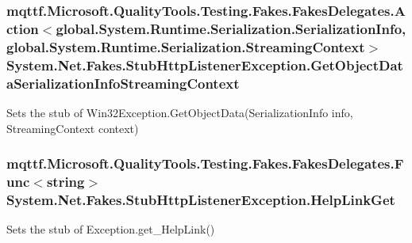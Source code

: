 \hypertarget{class_system_1_1_net_1_1_fakes_1_1_stub_http_listener_exception_aba44f8f6934146257ae4d5f9253fe294}{
\subsubsection[{Get\-Object\-Data\-Serialization\-Info\-Streaming\-Context}]{\setlength{\rightskip}{0pt plus 5cm}mqttf.\-Microsoft.\-Quality\-Tools.\-Testing.\-Fakes.\-Fakes\-Delegates.\-Action$<$global.\-System.\-Runtime.\-Serialization.\-Serialization\-Info, global.\-System.\-Runtime.\-Serialization.\-Streaming\-Context$>$ System.\-Net.\-Fakes.\-Stub\-Http\-Listener\-Exception.\-Get\-Object\-Data\-Serialization\-Info\-Streaming\-Context}}\label{class_system_1_1_net_1_1_fakes_1_1_stub_http_listener_exception_aba44f8f6934146257ae4d5f9253fe294}


Sets the stub of Win32\-Exception.\-Get\-Object\-Data(\-Serialization\-Info info, Streaming\-Context context)

\hypertarget{class_system_1_1_net_1_1_fakes_1_1_stub_http_listener_exception_a67fcb1915bf215a6e293419ace18fb8f}{
\subsubsection[{Help\-Link\-Get}]{\setlength{\rightskip}{0pt plus 5cm}mqttf.\-Microsoft.\-Quality\-Tools.\-Testing.\-Fakes.\-Fakes\-Delegates.\-Func$<$string$>$ System.\-Net.\-Fakes.\-Stub\-Http\-Listener\-Exception.\-Help\-Link\-Get}}\label{class_system_1_1_net_1_1_fakes_1_1_stub_http_listener_exception_a67fcb1915bf215a6e293419ace18fb8f}


Sets the stub of Exception.\-get\-\_\-\-Help\-Link()

